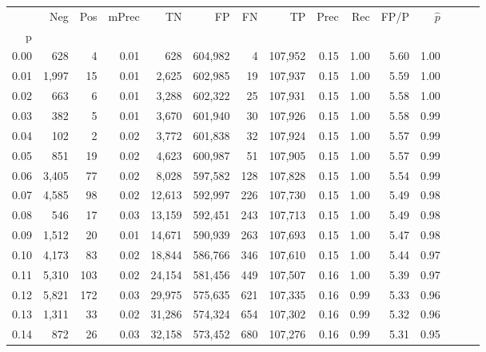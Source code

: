 \begin{tabular}{rrrrrrrrrrrrrrr}
\toprule
{} &     Neg &    Pos & mPrec &       TN &       FP &       FN &       TP &  Prec &   Rec &  FP/P & $\hat{p}$ \\
p    &         &        &       &          &          &          &          &       &       &       &           \\
\midrule
0.00 &     628 &      4 &  0.01 &      628 &  604,982 &        4 &  107,952 &  0.15 &  1.00 &  5.60 &      1.00 \\
0.01 &   1,997 &     15 &  0.01 &    2,625 &  602,985 &       19 &  107,937 &  0.15 &  1.00 &  5.59 &      1.00 \\
0.02 &     663 &      6 &  0.01 &    3,288 &  602,322 &       25 &  107,931 &  0.15 &  1.00 &  5.58 &      1.00 \\
0.03 &     382 &      5 &  0.01 &    3,670 &  601,940 &       30 &  107,926 &  0.15 &  1.00 &  5.58 &      0.99 \\
0.04 &     102 &      2 &  0.02 &    3,772 &  601,838 &       32 &  107,924 &  0.15 &  1.00 &  5.57 &      0.99 \\
0.05 &     851 &     19 &  0.02 &    4,623 &  600,987 &       51 &  107,905 &  0.15 &  1.00 &  5.57 &      0.99 \\
0.06 &   3,405 &     77 &  0.02 &    8,028 &  597,582 &      128 &  107,828 &  0.15 &  1.00 &  5.54 &      0.99 \\
0.07 &   4,585 &     98 &  0.02 &   12,613 &  592,997 &      226 &  107,730 &  0.15 &  1.00 &  5.49 &      0.98 \\
0.08 &     546 &     17 &  0.03 &   13,159 &  592,451 &      243 &  107,713 &  0.15 &  1.00 &  5.49 &      0.98 \\
0.09 &   1,512 &     20 &  0.01 &   14,671 &  590,939 &      263 &  107,693 &  0.15 &  1.00 &  5.47 &      0.98 \\
0.10 &   4,173 &     83 &  0.02 &   18,844 &  586,766 &      346 &  107,610 &  0.15 &  1.00 &  5.44 &      0.97 \\
0.11 &   5,310 &    103 &  0.02 &   24,154 &  581,456 &      449 &  107,507 &  0.16 &  1.00 &  5.39 &      0.97 \\
0.12 &   5,821 &    172 &  0.03 &   29,975 &  575,635 &      621 &  107,335 &  0.16 &  0.99 &  5.33 &      0.96 \\
0.13 &   1,311 &     33 &  0.02 &   31,286 &  574,324 &      654 &  107,302 &  0.16 &  0.99 &  5.32 &      0.96 \\
0.14 &     872 &     26 &  0.03 &   32,158 &  573,452 &      680 &  107,276 &  0.16 &  0.99 &  5.31 &      0.95 \\

\end{tabular}
